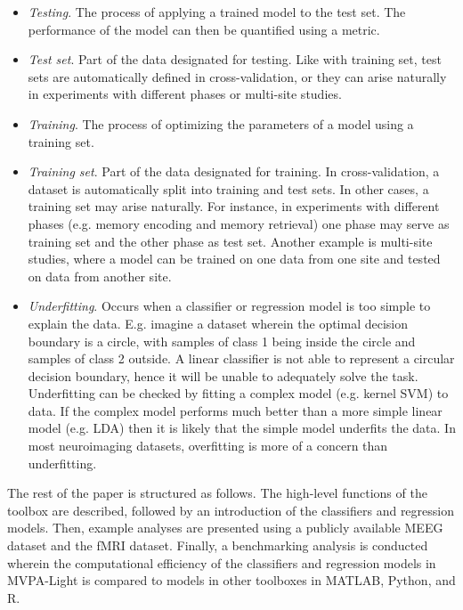 \documentclass[utf8]{frontiersSCNS} %
\begin{document}
\begin{itemize}
\item \textit{Testing}. The process of applying a trained model to the test set. The performance of the model can then be quantified using a metric.
\item \textit{Test set}. Part of the data designated for testing. Like with training set, test sets are automatically defined in cross-validation, or they can arise naturally in experiments with different phases or multi-site studies. 
\item \textit{Training}. The process of optimizing the parameters of a model using a training set.
\item \textit{Training set}. Part of the data designated for training. In cross-validation, a dataset is automatically split into training and test sets. In other cases, a training set may arise naturally. For instance, in experiments with different phases (e.g. memory encoding and memory retrieval) one phase may serve as training set and the other phase as test set. Another example is multi-site studies, where a model can be trained on one data from one site and tested on data from another site.
\item \textit{Underfitting}. Occurs when a classifier or regression model is too simple to explain the data. E.g. imagine a dataset wherein the optimal decision boundary is a circle, with samples of class 1 being inside the circle and samples of class 2 outside. A linear classifier is not able to represent a circular decision boundary, hence it will be unable to adequately solve the task. Underfitting can be checked by fitting a complex model (e.g. kernel SVM) to data. If the complex model performs much better than a more simple linear model (e.g. LDA) then it is likely that the simple model underfits the data. In most neuroimaging datasets, overfitting is more of a concern than underfitting.
\end{itemize}


The rest of the paper is structured as follows. The high-level functions of the toolbox are described, followed by an introduction of the classifiers and regression models. Then, example analyses are presented using a publicly available \cite{Wakeman2014OpenfMRI,Wakeman2015ADataset} MEEG dataset and the \cite{Haxby2001} fMRI dataset. Finally, a benchmarking analysis is conducted wherein the computational efficiency of the classifiers and regression models in MVPA-Light is compared to models in other toolboxes in MATLAB, Python, and R.


\end{document}
